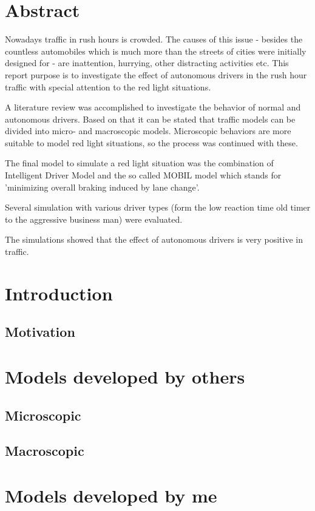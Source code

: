 \documentclass[a4paper,12pt,twoside]{book}
\begin{document}
	\chapter*{Abstract}
		Nowadays traffic in rush hours is crowded. The causes of this issue - besides the countless automobiles which is much more than the streets of cities were initially designed for - are inattention, hurrying, other distracting activities etc. This report purpose is to investigate the effect of autonomous drivers in the rush hour traffic with special attention to the red light situations.
		
		A literature review was accomplished to investigate the behavior of normal and autonomous drivers. Based on that it can be stated that traffic models can be divided into micro- and macroscopic models. Microscopic behaviors are more suitable to model red light situations, so the process was continued with these.
		
		The final model to simulate a red light situation was the combination of Intelligent Driver Model and the so called MOBIL model which stands for 'minimizing overall braking induced by lane change'.
		
		Several simulation with various driver types (form the low reaction time old timer to the aggressive business man) were evaluated.
		
		The simulations showed that the effect of autonomous drivers is very positive in traffic. 
	\chapter{Introduction}
		\section{Motivation}
	\chapter{Models developed by others}
		\section{Microscopic}
		\section{Macroscopic}
	\chapter{Models developed by me}
\end{document}
